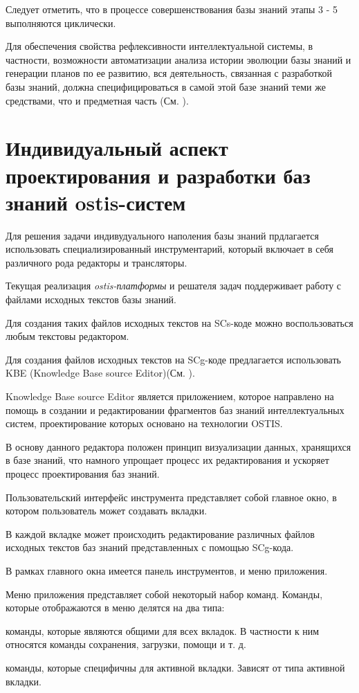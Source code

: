Следует отметить, что в процессе совершенствования базы знаний этапы 3 - 5 выполняются циклически.

Для обеспечения свойства рефлексивности интеллектуальной системы, в частности, возможности автоматизации анализа истории эволюции базы знаний и генерации планов по ее развитию, вся деятельность, связанная с разработкой базы знаний, должна специфицироваться в самой этой базе знаний теми же средствами, что и предметная часть (См. ).

\section{Индивидуальный аспект проектирования и разработки баз знаний ostis-систем}
\label{sec_kb_design_individual}

Для решения задачи индивудуального наполения базы знаний прдлагается использовать специализированный инструментарий, который включает в себя различного рода редакторы и трансляторы.

Текущая реализация \textit{ostis-платформы} и решателя задач поддерживает работу с файлами исходных текстов базы знаний.

Для создания таких файлов исходных текстов на SCs-коде можно воспользоваться любым текстовы редактором.


Для создания файлов исходных текстов на SCg-коде предлагается использовать KBE (Knowledge Base source Editor)(См. ). 

Knowledge Base source Editor является приложением, которое направлено на помощь в создании и редактировании фрагментов баз знаний интеллектуальных систем, проектирование которых основано на технологии OSTIS.

В основу данного редактора положен принцип визуализации данных, хранящихся в базе знаний, что намного упрощает процесс их редактирования и ускоряет процесс проектирования баз знаний.

Пользовательский интерфейс инструмента представляет собой главное окно, в котором пользователь может создавать вкладки.

В каждой вкладке может происходить редактирование различных файлов исходных текстов баз знаний представленных с помощью SCg-кода.

В рамках главного окна имеется панель инструментов, и меню приложения. 

Меню приложения представляет собой некоторый набор команд. Команды, которые отображаются в меню делятся на два типа:
\begin{textitemize}
\item команды, которые являются общими для всех вкладок. В частности к ним относятся команды сохранения, загрузки, помощи и т. д.
\item команды, которые специфичны для активной вкладки. Зависят от типа активной вкладки.
\end{textitemize}

